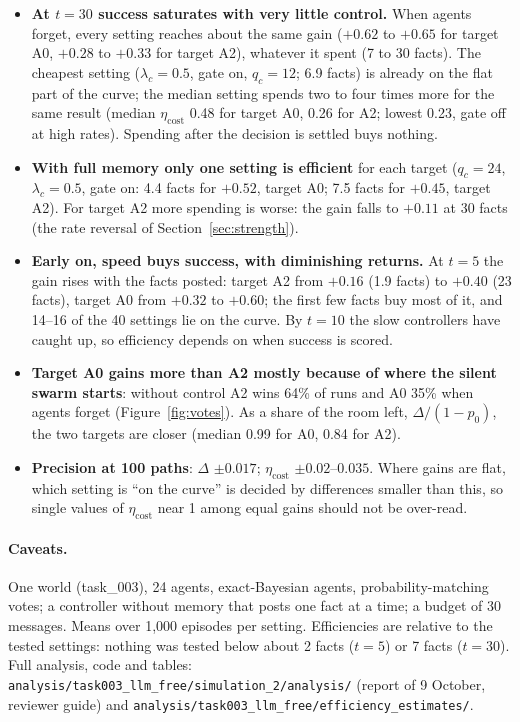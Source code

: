 \documentclass[10pt,a4paper]{article}
\begin{document}
\begin{itemize}\itemsep1pt
\item \textbf{At $t = 30$ success saturates with very little control.} When agents forget, every
  setting reaches about the same gain ($+0.62$ to $+0.65$ for target A0, $+0.28$ to $+0.33$ for target
  A2), whatever it spent (7 to 30 facts). The cheapest setting ($\lambda_c = 0.5$, gate on,
  $q_c = 12$; 6.9 facts) is already on the flat part of the curve; the median setting spends two to
  four times more for the same result (median $\eta_{\text{cost}}$ 0.48 for target A0, 0.26 for A2;
  lowest 0.23, gate off at high rates). Spending after the decision is settled buys nothing.
\item \textbf{With full memory only one setting is efficient} for each target ($q_c = 24$,
  $\lambda_c = 0.5$, gate on: 4.4 facts for $+0.52$, target A0; 7.5 facts for $+0.45$, target A2). For
  target A2 more spending is worse: the gain falls to $+0.11$ at 30 facts (the rate reversal of
  Section~\ref{sec:strength}).
\item \textbf{Early on, speed buys success, with diminishing returns.} At $t = 5$ the gain rises with
  the facts posted: target A2 from $+0.16$ (1.9 facts) to $+0.40$ (23 facts), target A0 from $+0.32$ to
  $+0.60$; the first few facts buy most of it, and 14--16 of the 40 settings lie on the curve. By
  $t = 10$ the slow controllers have caught up, so efficiency depends on when success is scored.
\item \textbf{Target A0 gains more than A2 mostly because of where the silent swarm starts}: without
  control A2 wins 64\% of runs and A0 35\% when agents forget (Figure~\ref{fig:votes}). As a share of
  the room left, $\Delta/(1-p_0)$, the two targets are closer (median 0.99 for A0, 0.84 for A2).
\item \textbf{Precision at 100 paths}: $\Delta$ $\pm0.017$; $\eta_{\text{cost}}$ $\pm0.02$--$0.035$. Where gains
  are flat, which setting is ``on the curve'' is decided by differences smaller than this, so single
  values of $\eta_{\text{cost}}$ near 1 among equal gains should not be over-read.
\end{itemize}

\paragraph{Caveats.} One world (task\_003), 24 agents, exact-Bayesian agents,
probability-matching votes; a controller without memory that posts one fact at a time; a
budget of 30 messages. Means over 1{,}000 episodes per setting. Efficiencies are relative to the
tested settings: nothing was tested below about 2 facts ($t = 5$) or 7 facts ($t = 30$). Full
analysis, code and tables: \texttt{analysis/task003\_llm\_free/simulation\_2/analysis/} (report of
9 October, reviewer guide) and \texttt{analysis/task003\_llm\_free/efficiency\_estimates/}.
\end{document}
